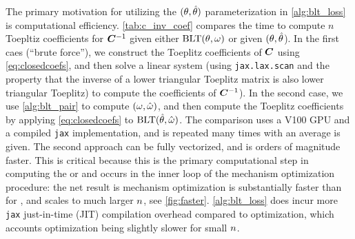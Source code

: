 The primary motivation for utilizing the $(\theta, \hat{\theta})$ parameterization in \cref{alg:blt_loss} is computational efficiency. \cref{tab:c_inv_coef} compares the time to compute $n$ Toepltiz coefficients for ${\bm{C}}^{-1}$ given either $\text{BLT}(\theta, \omega)$ or given $(\theta, \hat{\theta}$). In the first caes (``brute force''), we construct the Toeplitz coefficients of ${\bm{C}}$ using \cref{eq:closedcoefs}, and then solve a linear system (using \texttt{jax.lax.scan} and the property that the inverse of a lower triangular Toeplitz matrix is also lower triangular Toeplitz) to compute the coefficients of ${\bm{C}}^{-1}$). In the second case, we use \cref{alg:blt_pair} to compute $(\omega, \hat{\omega})$, and then compute the Toeplitz coefficients by applying \cref{eq:closedcoefs} to $\text{BLT}(\hat{\theta}, \hat{\omega})$. The comparison uses a V100 GPU and a compiled \texttt{jax} implementation, and is repeated many times with an average is given. The second approach can be fully vectorized, and is orders of magnitude faster. This is critical because this is the primary computational step in computing the \rmsloss or \maxloss and occurs in the inner loop of the mechanism optimization procedure: the net result is mechanism optimization is substantially faster than for \bandmf, and scales to much larger $n$, see \cref{fig:faster}. \cref{alg:blt_loss} does incur more \texttt{jax} just-in-time (JIT) compilation overhead compared to \bandmf optimization, which accounts \blt optimization being slightly slower for small $n$.